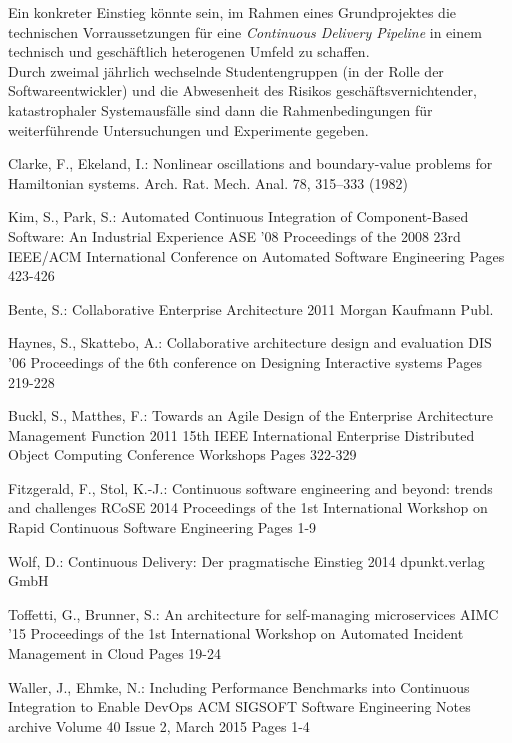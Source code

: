 \documentclass{llncs}
\begin{document}
Ein konkreter Einstieg könnte sein, im Rahmen eines Grundprojektes die technischen Vorraussetzungen für eine \textit{Continuous Delivery Pipeline} in einem technisch und geschäftlich heterogenen Umfeld zu schaffen.\\

Durch zweimal jährlich wechselnde Studentengruppen (in der Rolle der Softwareentwickler) und die Abwesenheit des Risikos geschäftsvernichtender, katastrophaler Systemausfälle sind dann die Rahmenbedingungen für weiterführende Untersuchungen und Experimente gegeben.

\cite{SeojinKim:2008:ACI:1642931.1642990}
\cite{clar:eke}


\begin{thebibliography}{1}
Clarke, F., Ekeland, I.:
Nonlinear oscillations and boundary-value problems for
Hamiltonian systems.
Arch. Rat. Mech. Anal. 78, 315--333 (1982)

Kim, S., Park, S.:
Automated Continuous Integration of Component-Based Software: An Industrial Experience
ASE '08 Proceedings of the 2008 23rd IEEE/ACM International Conference on Automated Software Engineering
Pages 423-426

Bente, S.:
Collaborative Enterprise Architecture
2011 Morgan Kaufmann Publ.

Haynes, S., Skattebo, A.:
Collaborative architecture design and evaluation
DIS '06 Proceedings of the 6th conference on Designing Interactive systems
Pages 219-228

Buckl, S., Matthes, F.:
Towards an Agile Design of the Enterprise Architecture Management Function
2011 15th IEEE International Enterprise Distributed Object Computing Conference Workshops
Pages 322-329

Fitzgerald, F., Stol, K.-J.:
Continuous software engineering and beyond: trends and challenges
RCoSE 2014 Proceedings of the 1st International Workshop on Rapid Continuous Software Engineering
Pages 1-9

Wolf, D.:
Continuous Delivery: Der pragmatische Einstieg
2014 dpunkt.verlag GmbH

Toffetti, G., Brunner, S.:
An architecture for self-managing microservices
AIMC '15 Proceedings of the 1st International Workshop on Automated Incident Management in Cloud
Pages 19-24

Waller, J., Ehmke, N.:
Including Performance Benchmarks into Continuous Integration to Enable DevOps
ACM SIGSOFT Software Engineering Notes archive
Volume 40 Issue 2, March 2015 
Pages 1-4 
%
\end{thebibliography}
\end{document}
